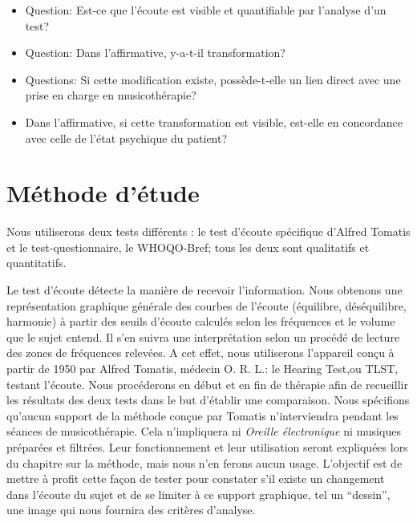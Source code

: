  
 \begin{itemize}
 \item  Question:
   Est-ce que l'écoute est visible et quantifiable par
          l'analyse d'un test?
 
 \item Question:
   Dans l'affirmative, y-a-t-il transformation?
   
 \item Questions:
   Si cette modification existe, possède-t-elle un lien direct avec une prise en charge
  en musicothérapie?
  
  \item Dans l'affirmative, 
   si cette transformation est visible, est-elle en 
 	concordance 
 	avec celle de l'état psychique du patient?
        
 \end{itemize}
 

\section{Méthode d'étude}

	Nous utiliserons deux tests différents : 
	le test d'écoute spécifique d'Alfred Tomatis
	et le test-questionnaire, le WHOQO-Bref; tous les deux sont
        qualitatifs et quantitatifs.

        
        Le test d'écoute détecte la manière de recevoir
        l'information. Nous obtenons une  
	représentation graphique générale des courbes de l'écoute
        (équilibre, déséquilibre, harmonie) à partir des seuils d'écoute
        calculés selon les fréquences et le volume que le sujet entend. Il s'en suivra une interprétation
        selon un procédé de lecture des zones de fréquences relevées.
	A cet effet, nous utiliserons l'appareil conçu à partir de 1950 par Alfred Tomatis, médecin
        O. R. L.: le Hearing Test,ou TLST, testant
        l'écoute.
	Nous procéderons en début et en fin de thérapie
        afin de recueillir les résultats des
        deux tests dans le but d'établir une comparaison.
        Nous spécifions qu'aucun support de la méthode conçue par
        Tomatis n'interviendra pendant les séances de musicothérapie.
        Cela n'impliquera ni 
\textsl{Oreille
	électronique} ni musiques préparées et filtrées. Leur
      fonctionnement et leur utilisation seront expliquées lors du
      chapitre sur la méthode, mais nous n'en ferons aucun
      usage. L'objectif est de mettre à profit cette façon de  tester pour constater
      s'il existe un changement dans l'écoute du sujet et de
      se limiter à ce support graphique, tel un ``dessin'',
      une image qui nous fournira des critères d'analyse.
       

